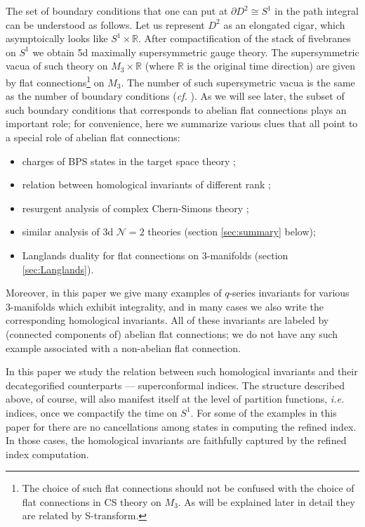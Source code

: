 \documentclass[hyper,letterpaper]{JHEP3}
\newcommand{\R}{{\mathbb R}}
\def\CN{{\mathcal N}}
\begin{document}
The set of boundary conditions that one can put at $\partial D^2\cong S^1$ in the path integral can be understood as follows. Let us represent $D^2$ as an elongated cigar, which asymptoically looks like $S^1\times \R$. After compactification of the stack of fivebranes on $S^1$ we obtain 5d maximally supersymmetric gauge theory. The supersymmetric vacua of such theory on $M_3\times \R$ (where $\R$ is the original time direction) are given by flat connections\footnote{The choice of such flat connections should not be confused with the choice of flat connections in CS theory on $M_3$. As will be explained later in detail they are related by S-transform.} on $M_3$. The number of such supersymetric vacua is the same as the number of boundary conditions (\textit{cf.} \cite{Cecotti:1991me,Witten:2011zz,Pasquetti:2011fj,Beem:2012mb,Cecotti:2013mba}). As we will see later, the subset of such boundary conditions that corresponds to abelian flat connections plays an important role; for convenience, here we summarize various clues that all point to a special role of abelian flat connections:

\begin{itemize}

\item
charges of BPS states in the target space theory \cite{Ooguri:1999bv};

\item
relation between homological invariants of different rank \cite{Gukov:2016gkn};

\item
resurgent analysis of complex Chern-Simons theory \cite{Gukov:2016njj};

\item
similar analysis of 3d $\CN=2$ theories (section \ref{sec:summary} below);

\item
Langlands duality for flat connections on 3-manifolds (section \ref{sec:Langlands}).

\end{itemize}
\noindent
Moreover, in this paper we give many examples of $q$-series invariants for various 3-manifolds
which exhibit integrality, and in many cases we also write the corresponding homological invariants.
All of these invariants are labeled by (connected components of) abelian flat connections;
we do not have any such example associated with a non-abelian flat connection.

In this paper we study the relation between such homological invariants and their decategorified counterparts --- superconformal indices. The structure described above, of course, will also manifest itself at the level of partition functions, {\it i.e.} indices, once we compactify the time on $S^1$. For some of the examples in this paper for there are no cancellations among states in computing the refined index. In those cases, the homological invariants are faithfully captured by the refined index computation.
\end{document}
